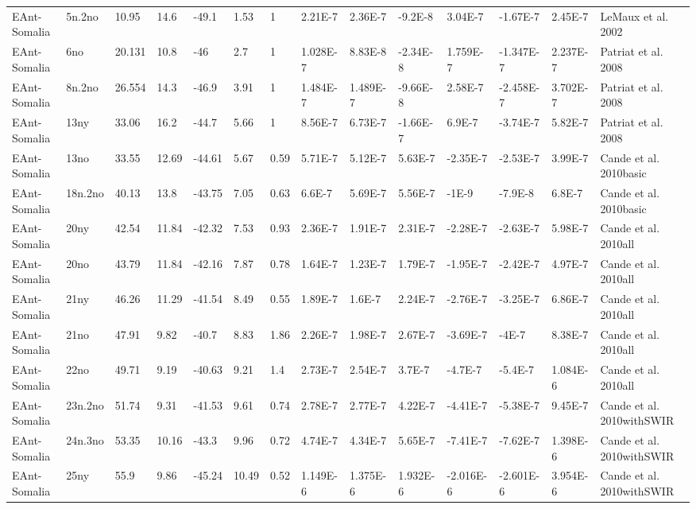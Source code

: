 \begin{landscape}
\begin{longtable}{@{}lllllllllllll>{\scriptsize}p{3.1cm}@{}}
EAnt-Somalia & 5n.2no & 10.95 & 14.6 & -49.1 & 1.53 & 1 & 2.21E-7 & 2.36E-7 & -9.2E-8 & 3.04E-7 & -1.67E-7 & 2.45E-7 & LeMaux et al. 2002 \\
EAnt-Somalia & 6no & 20.131 & 10.8 & -46 & 2.7 & 1 & 1.028E-7 & 8.83E-8 & -2.34E-8 & 1.759E-7 & -1.347E-7 & 2.237E-7 & Patriat et al. 2008 \\
EAnt-Somalia & 8n.2no & 26.554 & 14.3 & -46.9 & 3.91 & 1 & 1.484E-7 & 1.489E-7 & -9.66E-8 & 2.58E-7 & -2.458E-7 & 3.702E-7 & Patriat et al. 2008 \\
EAnt-Somalia & 13ny & 33.06 & 16.2 & -44.7 & 5.66 & 1 & 8.56E-7 & 6.73E-7 & -1.66E-7 & 6.9E-7 & -3.74E-7 & 5.82E-7 & Patriat et al. 2008 \\
EAnt-Somalia & 13no & 33.55 & 12.69 & -44.61 & 5.67 & 0.59 & 5.71E-7 & 5.12E-7 & 5.63E-7 & -2.35E-7 & -2.53E-7 & 3.99E-7 & Cande et al. 2010basic \\
EAnt-Somalia & 18n.2no & 40.13 & 13.8 & -43.75 & 7.05 & 0.63 & 6.6E-7 & 5.69E-7 & 5.56E-7 & -1E-9 & -7.9E-8 & 6.8E-7 & Cande et al. 2010basic \\
EAnt-Somalia & 20ny & 42.54 & 11.84 & -42.32 & 7.53 & 0.93 & 2.36E-7 & 1.91E-7 & 2.31E-7 & -2.28E-7 & -2.63E-7 & 5.98E-7 & Cande et al. 2010all \\
EAnt-Somalia & 20no & 43.79 & 11.84 & -42.16 & 7.87 & 0.78 & 1.64E-7 & 1.23E-7 & 1.79E-7 & -1.95E-7 & -2.42E-7 & 4.97E-7 & Cande et al. 2010all \\
EAnt-Somalia & 21ny & 46.26 & 11.29 & -41.54 & 8.49 & 0.55 & 1.89E-7 & 1.6E-7 & 2.24E-7 & -2.76E-7 & -3.25E-7 & 6.86E-7 & Cande et al. 2010all \\
EAnt-Somalia & 21no & 47.91 & 9.82 & -40.7 & 8.83 & 1.86 & 2.26E-7 & 1.98E-7 & 2.67E-7 & -3.69E-7 & -4E-7 & 8.38E-7 & Cande et al. 2010all \\
EAnt-Somalia & 22no & 49.71 & 9.19 & -40.63 & 9.21 & 1.4 & 2.73E-7 & 2.54E-7 & 3.7E-7 & -4.7E-7 & -5.4E-7 & 1.084E-6 & Cande et al. 2010all \\
EAnt-Somalia & 23n.2no & 51.74 & 9.31 & -41.53 & 9.61 & 0.74 & 2.78E-7 & 2.77E-7 & 4.22E-7 & -4.41E-7 & -5.38E-7 & 9.45E-7 & Cande et al. 2010withSWIR \\
EAnt-Somalia & 24n.3no & 53.35 & 10.16 & -43.3 & 9.96 & 0.72 & 4.74E-7 & 4.34E-7 & 5.65E-7 & -7.41E-7 & -7.62E-7 & 1.398E-6 & Cande et al. 2010withSWIR \\
EAnt-Somalia & 25ny & 55.9 & 9.86 & -45.24 & 10.49 & 0.52 & 1.149E-6 & 1.375E-6 & 1.932E-6 & -2.016E-6 & -2.601E-6 & 3.954E-6 & Cande et al. 2010withSWIR \\

\end{longtable}
\end{landscape}
